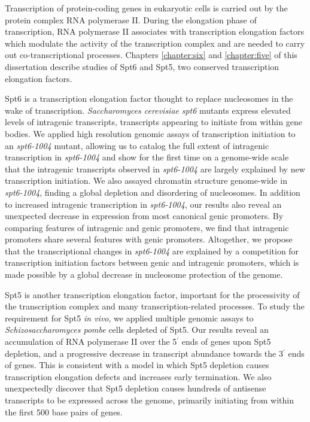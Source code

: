 \begin{abstractpage}

Transcription of protein-coding genes in eukaryotic cells is carried out by the protein complex RNA polymerase II.
During the elongation phase of transcription, RNA polymerase II associates with transcription elongation factors which modulate the activity of the transcription complex and are needed to carry out co-transcriptional processes.
Chapters \ref{chapter:six} and \ref{chapter:five} of this dissertation describe studies of Spt6 and Spt5, two conserved transcription elongation factors.

Spt6 is a transcription elongation factor thought to replace nucleosomes in the wake of transcription.
\textit{Saccharomyces cerevisiae} \textit{spt6} mutants express elevated levels of intragenic transcripts, transcripts appearing to initiate from within gene bodies.
We applied high resolution genomic assays of transcription initiation to an \textit{spt6-1004} mutant, allowing us to catalog the full extent of intragenic transcription in \textit{spt6-1004} and show for the first time on a genome-wide scale that the intragenic transcripts observed in \textit{spt6-1004} are largely explained by new transcription initiation.
We also assayed chromatin structure genome-wide in \textit{spt6-1004}, finding a global depletion and disordering of nucleosomes.
In addition to increased intragenic transcription in \textit{spt6-1004}, our results also reveal an unexpected decrease in expression from most canonical genic promoters.
By comparing features of intragenic and genic promoters, we find that intragenic promoters share several features with genic promoters.
Altogether, we propose that the transcriptional changes in \textit{spt6-1004} are explained by a competition for transcription initiation factors between genic and intragenic promoters, which is made possible by a global decrease in nucleosome protection of the genome.

Spt5 is another transcription elongation factor, important for the processivity of the transcription complex and many transcription-related processes.
To study the requirement for Spt5 \textit{in vivo}, we applied multiple genomic assays to \textit{Schizosaccharomyces pombe} cells depleted of Spt5.
Our results reveal an accumulation of RNA polymerase II over the 5$^\prime$ ends of genes upon Spt5 depletion, and a progressive decrease in transcript abundance towards the 3$^\prime$ ends of genes.
This is consistent with a model in which Spt5 depletion causes transcription elongation defects and increases early termination.
We also unexpectedly discover that Spt5 depletion causes hundreds of antisense transcripts to be expressed across the genome, primarily initiating from within the first 500 base pairs of genes.


\end{abstractpage}
